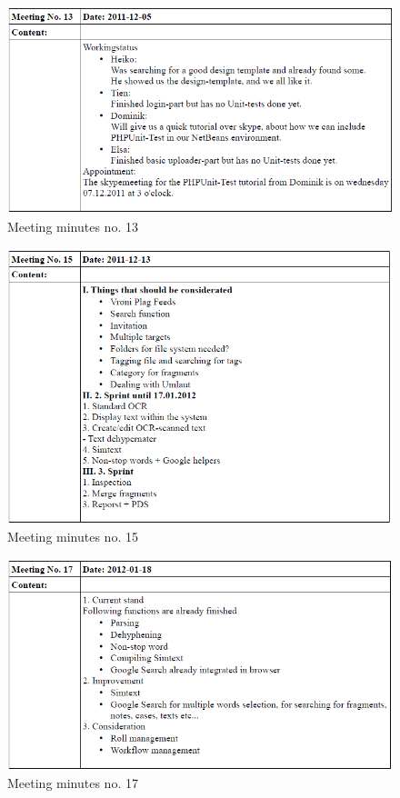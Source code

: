 \begin{appendix}
\begin{figure}[htbp]
  \centering
    \includegraphics[width=\textwidth]{images/a_meetings/meeting_13}
  \caption{Meeting minutes no. 13}
  \label{fig:meeting minutes no. 13}
\end{figure}

\begin{figure}[htbp]
  \centering
    \includegraphics[width=\textwidth]{images/a_meetings/meeting_15}
  \caption{Meeting minutes no. 15}
  \label{fig:meeting minutes no. 15}
\end{figure}

\begin{figure}[htbp]
  \centering
    \includegraphics[width=\textwidth]{images/a_meetings/meeting_17}
  \caption{Meeting minutes no. 17}
  \label{fig:Meeting minutes no. 17}
\end{figure}


\end{appendix}
